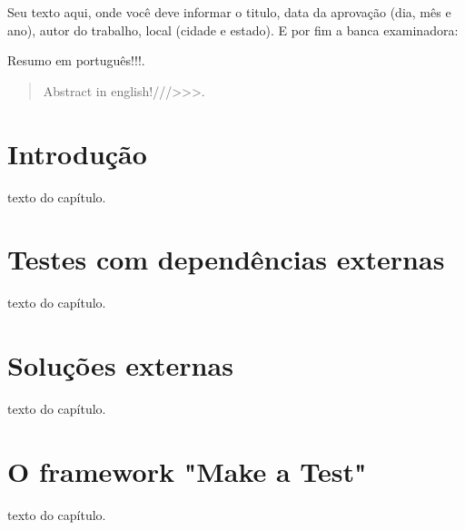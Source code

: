 \documentclass{abnt}
\begin{document}
\capa
\folhaderosto

\setlength{\ABNTsignthickness}{1pt}
\begin{folhadeaprovacao}
	Seu texto aqui, onde você deve informar o titulo, data da aprovação (dia, mês e ano), autor do trabalho, local (cidade e estado). E por fim a banca examinadora:
\end{folhadeaprovacao}

\begin{resumo}
	Resumo em português!!!.
\end{resumo}

\begin{abstract}
	Abstract in english!///>>>.
\end{abstract}

\sumario

\chapter{Introdução} 
texto do capítulo.

\chapter{Testes com dependências externas} 
texto do capítulo.

\chapter{Soluções externas} 
texto do capítulo.

\chapter{O framework "Make a Test"} 
texto do capítulo. \cite{apache-synapse}


\end{document}

